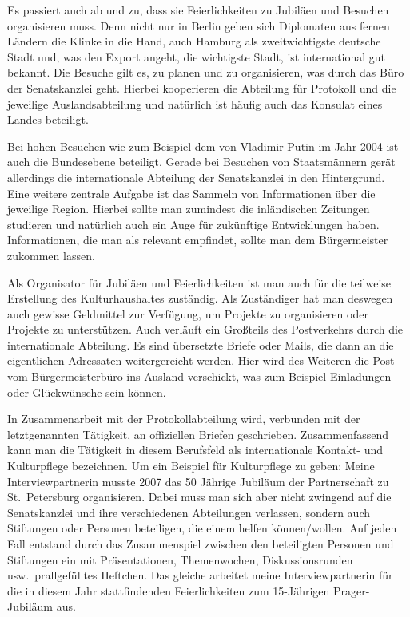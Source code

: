 \documentclass{../../sem_paper}
\begin{document}
Es passiert auch ab und zu, dass sie Feierlichkeiten zu Jubiläen und Besuchen organisieren muss. Denn nicht nur in Berlin geben sich Diplomaten aus fernen Ländern die Klinke in die Hand, auch Hamburg als zweitwichtigste deutsche Stadt und, was den Export angeht, die wichtigste Stadt, ist international gut bekannt. Die Besuche gilt es, zu planen und zu organisieren, was durch das Büro der Senatskanzlei geht. Hierbei kooperieren die Abteilung für Protokoll und die jeweilige Auslandsabteilung und natürlich ist häufig auch das Konsulat eines Landes beteiligt.

Bei hohen Besuchen wie zum Beispiel dem von Vladimir Putin im Jahr 2004 ist auch die Bundesebene beteiligt. Gerade bei Besuchen von Staatsmännern gerät allerdings  die internationale  Abteilung der Senatskanzlei in den Hintergrund.
Eine weitere zentrale Aufgabe ist das Sammeln von Informationen über die jeweilige Region. Hierbei sollte man zumindest die inländischen Zeitungen studieren und natürlich auch ein Auge für zukünftige Entwicklungen haben. Informationen, die man als relevant empfindet, sollte man dem Bürgermeister zukommen lassen.

Als Organisator für Jubiläen und Feierlichkeiten ist man auch für die teilweise Erstellung des Kulturhaushaltes zuständig. Als Zuständiger hat man deswegen auch gewisse Geldmittel zur Verfügung, um Projekte zu organisieren oder Projekte zu unterstützen.
Auch verläuft ein Großteils des Postverkehrs durch die internationale Abteilung. Es sind übersetzte Briefe oder Mails, die dann an die eigentlichen Adressaten weitergereicht werden. Hier wird des Weiteren die Post vom Bürgermeisterbüro ins Ausland verschickt, was zum Beispiel Einladungen oder Glückwünsche sein können.

In Zusammenarbeit mit der Protokollabteilung wird, verbunden mit der letztgenannten Tätigkeit, an offiziellen Briefen geschrieben.
Zusammenfassend kann man die Tätigkeit in diesem Berufsfeld als internationale Kontakt- und Kulturpflege bezeichnen.
Um ein Beispiel für Kulturpflege zu geben: Meine Interviewpartnerin musste  2007 das 50 Jährige Jubiläum der Partnerschaft zu St.\ Petersburg organisieren. Dabei muss man sich aber nicht zwingend auf die Senatskanzlei und ihre verschiedenen Abteilungen verlassen, sondern auch Stiftungen oder Personen beteiligen, die einem helfen können/wollen. Auf jeden Fall entstand durch das Zusammenspiel zwischen den beteiligten Personen und Stiftungen ein mit Präsentationen, Themenwochen, Diskussionsrunden usw.\  prallgefülltes Heftchen.
Das gleiche arbeitet meine Interviewpartnerin für die in diesem Jahr stattfindenden Feierlichkeiten zum 15-Jährigen Prager-Jubiläum aus.
\end{document}
